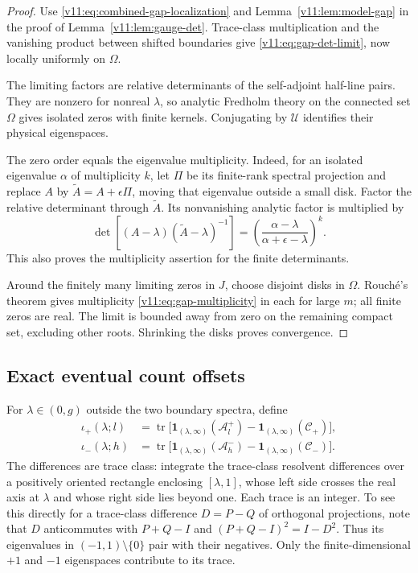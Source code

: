 \begin{proof}
Use \eqref{v11:eq:combined-gap-localization} and
Lemma~\ref{v11:lem:model-gap} in the proof of
Lemma~\ref{v11:lem:gauge-det}.  Trace-class multiplication and the
vanishing product between shifted boundaries give
\eqref{v11:eq:gap-det-limit}, now locally uniformly on $\Omega$.

The limiting factors are relative determinants of the self-adjoint
half-line pairs. They are nonzero for nonreal $\lambda$, so analytic
Fredholm theory on the connected set $\Omega$ gives isolated zeros
with finite kernels. Conjugating by $\mathscr U$ identifies their
physical eigenspaces.

The zero order equals the eigenvalue multiplicity.  Indeed, for an
isolated eigenvalue $\alpha$ of multiplicity $k$, let $\Pi$ be its
finite-rank spectral projection and replace $A$ by
$\widetilde A=A+\epsilon\Pi$, moving that eigenvalue outside a small
disk.  Factor the relative determinant through $\widetilde A$.
Its nonvanishing analytic factor is multiplied by
\[
 \det[(A-\lambda)(\widetilde A-\lambda)^{-1}]
       =\left(\frac{\alpha-\lambda}{\alpha+\epsilon-\lambda}\right)^k.
\]
This also proves the multiplicity assertion for the finite determinants.

Around the finitely many limiting zeros in $J$, choose disjoint disks
in $\Omega$. Rouch\'e's theorem gives multiplicity
\eqref{v11:eq:gap-multiplicity} in each for large $m$; all finite zeros
are real. The limit is bounded away from zero on the remaining compact
set, excluding other roots. Shrinking the disks proves convergence.
\end{proof}

\subsection{Exact eventual count offsets}

For $\lambda\in(0,g)$ outside the two boundary spectra, define
\begin{align}
 \iota_+(\lambda;l)
  &=\operatorname{tr}\bigl[\mathbf1_{(\lambda,\infty)}(\mathscr A_l^+)
                  -\mathbf1_{(\lambda,\infty)}(\mathscr C_+)\bigr],\nonumber\\
 \iota_-(\lambda;h)
  &=\operatorname{tr}\bigl[\mathbf1_{(\lambda,\infty)}(\mathscr A_h^-)
                  -\mathbf1_{(\lambda,\infty)}(\mathscr C_-)\bigr].
 \label{v11:eq:gap-indices}
\end{align}
The differences are trace class: integrate the trace-class resolvent
differences over a positively oriented rectangle enclosing
$[\lambda,1]$, whose left side crosses the real axis at $\lambda$ and
whose right side lies beyond one.  Each trace is an integer.  To see
this directly for a trace-class difference $D=P-Q$ of orthogonal
projections, note that $D$ anticommutes with $P+Q-I$ and
$(P+Q-I)^2=I-D^2$.  Thus its eigenvalues in $(-1,1)\setminus\{0\}$
pair with their negatives.  Only the finite-dimensional $+1$ and $-1$
eigenspaces contribute to its trace.

